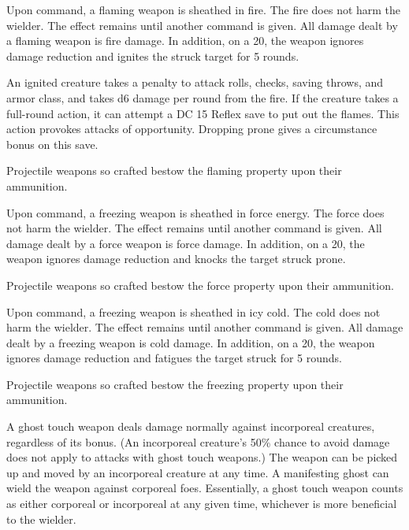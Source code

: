 
 Upon command, a flaming weapon is sheathed in fire. The fire does not harm the wielder. The effect remains until another command is given. All damage dealt by a flaming weapon is fire damage. In addition, on a 20, the weapon ignores damage reduction and ignites the struck target for 5 rounds.
\par An ignited creature takes a  penalty to attack rolls, checks, saving throws, and armor class, and takes d6 damage per round from the fire. If the creature takes a full-round action, it can attempt a DC 15 Reflex save to put out the flames. This action provokes attacks of opportunity. Dropping prone gives a  circumstance bonus on this save.
\par Projectile weapons so crafted bestow the flaming property upon their ammunition.


 Upon command, a freezing weapon is sheathed in force energy. The force does not harm the wielder. The effect remains until another command is given. All damage dealt by a force weapon is force damage. In addition, on a 20, the weapon ignores damage reduction and knocks the target struck prone.
\par Projectile weapons so crafted bestow the force property upon their ammunition.


 Upon command, a freezing weapon is sheathed in icy cold. The cold does not harm the wielder. The effect remains until another command is given. All damage dealt by a freezing weapon is cold damage. In addition, on a 20, the weapon ignores damage reduction and fatigues the target struck for 5 rounds.
\par Projectile weapons so crafted bestow the freezing property upon their ammunition.


 A ghost touch weapon deals damage normally against incorporeal creatures, regardless of its bonus. (An incorporeal creature's 50\% chance to avoid damage does not apply to attacks with ghost touch weapons.) The weapon can be picked up and moved by an incorporeal creature at any time. A manifesting ghost can wield the weapon against corporeal foes. Essentially, a ghost touch weapon counts as either corporeal or incorporeal at any given time, whichever is more beneficial to the wielder.

